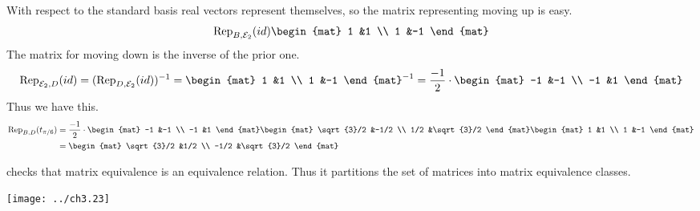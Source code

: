 \documentclass[10pt,t]{beamer}
\begin{document}
\begin{frame}
With respect to the standard basis real vectors represent themselves,
so the matrix representing moving up is easy.
\begin{equation*}
  \rep{id}{B,\stdbasis_2}
  \begin{mat}
    1 &1 \\
    1 &-1
  \end{mat}
\end{equation*}
The matrix for moving down is the inverse of the prior one.
\begin{equation*}
  \rep{id}{\stdbasis_2,D}
  =(\rep{id}{D,\stdbasis_2})^{-1}
  =
  \begin{mat}
    1 &1 \\
    1 &-1
  \end{mat}^{-1}
  =\frac{-1}{2}\cdot
  \begin{mat}
    -1 &-1 \\
   -1  &1
  \end{mat}
\end{equation*}
Thus we have this.
\begin{align*}
  \rep{t_{\pi/6}}{B,D}
  &=\frac{-1}{2}\cdot
  \begin{mat}
    -1 &-1 \\
   -1  &1
  \end{mat}
  \begin{mat}
    \sqrt{3}/2  &-1/2 \\
    1/2         &\sqrt{3}/2
  \end{mat}
  \begin{mat}
    1 &1 \\
    1 &-1
  \end{mat}                         \\
  &=
  \begin{mat}
    \sqrt{3}/2 &1/2 \\
    -1/2       &\sqrt{3}/2   
  \end{mat}
\end{align*}
\end{frame}




\begin{frame}
\pause
\co[le:MatEqIsSameMap]

\pause
\medskip
{} checks that
matrix equivalence is an equivalence relation.
Thus it  partitions 
the set of matrices into matrix equivalence classes.
\begin{center}
  \texttt{[image: ../ch3.23]}
\end{center}
\end{frame}
\end{document}
